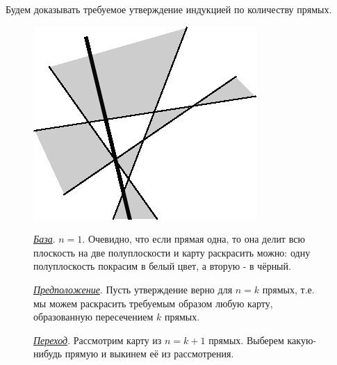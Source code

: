 \begin{prf}
Будем доказывать требуемое утверждение индукцией по количеству прямых.
\begin{figure}[h]
\begin{minipage}{0.25\linewidth}
    \includegraphics[width=0.95\columnwidth]{img/figura 6.0 1.png}
\end{minipage}
\hfill
\begin{minipage}{0.69\linewidth}\setlength{\parindent}{1.5em}
\textit{\underline{База}}. $n = 1$. Очевидно, что если прямая одна, то она делит всю плоскость на две полуплоскости и карту раскрасить можно: одну полуплоскость покрасим в белый цвет, а вторую - в чёрный.
\par
\textit{\underline{Предположение}}. Пусть утверждение верно для
$n = k$ прямых, т.е. мы можем раскрасить требуемым образом любую карту, образованную пересечением $k$ прямых.
\par
\textit{\underline{Переход}}. Рассмотрим карту из $n = k + 1$
прямых. Выберем какую-нибудь прямую и выкинем её из рассмотрения.
\end{minipage}
\end{figure}
\begin{figure}[H]
\begin{minipage}{0.25\linewidth}

\end{minipage}
\end{figure}
\end{prf}
